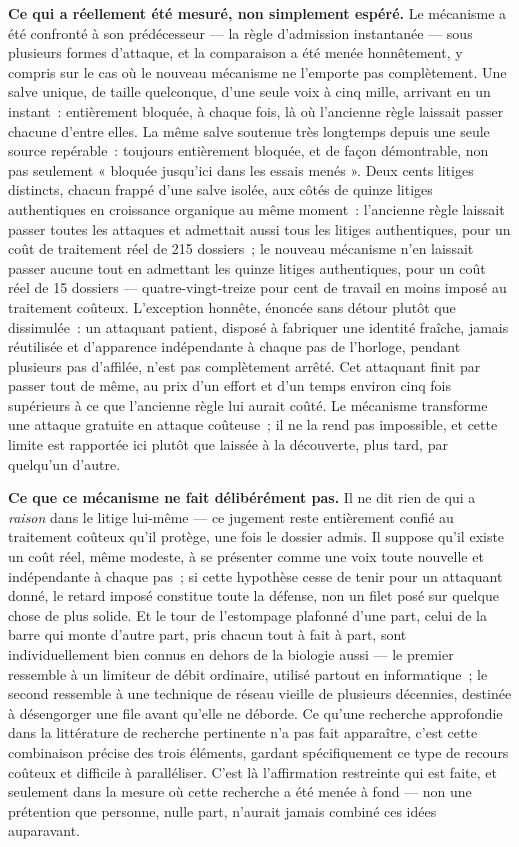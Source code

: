 \documentclass[11pt]{article}
\begin{document}
\textbf{Ce qui a réellement été mesuré, non simplement espéré.} Le
mécanisme a été confronté à son prédécesseur --- la règle d'admission
instantanée --- sous plusieurs formes d'attaque, et la comparaison a été
menée honnêtement, y compris sur le cas où le nouveau mécanisme ne
l'emporte pas complètement. Une salve unique, de taille quelconque, d'une
seule voix à cinq mille, arrivant en un instant~: entièrement bloquée, à
chaque fois, là où l'ancienne règle laissait passer chacune d'entre
elles. La même salve soutenue très longtemps depuis une seule source
repérable~: toujours entièrement bloquée, et de façon démontrable, non
pas seulement « bloquée jusqu'ici dans les essais menés ». Deux cents
litiges distincts, chacun frappé d'une salve isolée, aux côtés de quinze
litiges authentiques en croissance organique au même moment~: l'ancienne
règle laissait passer toutes les attaques et admettait aussi tous les
litiges authentiques, pour un coût de traitement réel de 215 dossiers~;
le nouveau mécanisme n'en laissait passer aucune tout en admettant les
quinze litiges authentiques, pour un coût réel de 15 dossiers --- quatre-vingt-treize
pour cent de travail en moins imposé au traitement coûteux. L'exception
honnête, énoncée sans détour plutôt que dissimulée~: un attaquant patient,
disposé à fabriquer une identité fraîche, jamais réutilisée et
d'apparence indépendante à chaque pas de l'horloge, pendant plusieurs pas
d'affilée, n'est pas complètement arrêté. Cet attaquant finit par passer
tout de même, au prix d'un effort et d'un temps environ cinq fois
supérieurs à ce que l'ancienne règle lui aurait coûté. Le mécanisme
transforme une attaque gratuite en attaque coûteuse~; il ne la rend pas
impossible, et cette limite est rapportée ici plutôt que laissée à la
découverte, plus tard, par quelqu'un d'autre.

\textbf{Ce que ce mécanisme ne fait délibérément pas.} Il ne dit rien de
qui a \emph{raison} dans le litige lui-même --- ce jugement reste
entièrement confié au traitement coûteux qu'il protège, une fois le
dossier admis. Il suppose qu'il existe un coût réel, même modeste, à se
présenter comme une voix toute nouvelle et indépendante à chaque pas~;
si cette hypothèse cesse de tenir pour un attaquant donné, le retard
imposé constitue toute la défense, non un filet posé sur quelque chose
de plus solide. Et le tour de l'estompage plafonné d'une part, celui de
la barre qui monte d'autre part, pris chacun tout à fait à part, sont
individuellement bien connus en dehors de la biologie aussi --- le
premier ressemble à un limiteur de débit ordinaire, utilisé partout en
informatique~; le second ressemble à une technique de réseau vieille de
plusieurs décennies, destinée à désengorger une file avant qu'elle ne
déborde. Ce qu'une recherche approfondie dans la littérature de recherche
pertinente n'a pas fait apparaître, c'est cette combinaison précise des
trois éléments, gardant spécifiquement ce type de recours coûteux et
difficile à paralléliser. C'est là l'affirmation restreinte qui est
faite, et seulement dans la mesure où cette recherche a été menée à
fond --- non une prétention que personne, nulle part, n'aurait jamais
combiné ces idées auparavant.
\end{document}
